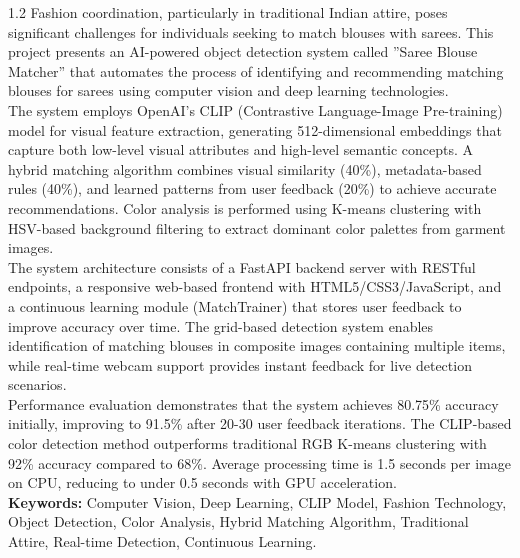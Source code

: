 \documentclass[12pt,a4paper]{report}
\begin{document}
\begin{spacing}{1.2}
Fashion coordination, particularly in traditional Indian attire, poses significant challenges for individuals seeking to match blouses with sarees. This project presents an AI-powered object detection system called ”Saree Blouse Matcher” that automates the process of identifying and recommending matching blouses for sarees using computer vision and deep learning technologies. \\

The system employs OpenAI’s CLIP (Contrastive Language-Image Pre-training) model for visual feature extraction, generating 512-dimensional embeddings that capture both low-level visual attributes and high-level semantic concepts. A hybrid matching algorithm combines visual similarity (40\%), metadata-based rules (40\%), and learned patterns from user feedback (20\%) to achieve accurate recommendations. Color analysis is performed using K-means clustering with HSV-based background filtering to extract dominant color palettes from garment images. \\

The system architecture consists of a FastAPI backend server with RESTful endpoints, a responsive web-based frontend with HTML5/CSS3/JavaScript, and a continuous learning module (MatchTrainer) that stores user feedback to improve accuracy over time. The grid-based detection system enables identification of matching blouses in composite images containing multiple items, while real-time webcam support provides instant feedback for live detection scenarios. \\

Performance evaluation demonstrates that the system achieves 80.75\% accuracy initially, improving to 91.5\% after 20-30 user feedback iterations. The CLIP-based color detection method outperforms traditional RGB K-means clustering with 92\% accuracy compared to 68\%. Average processing time is 1.5 seconds per image on CPU, reducing to under 0.5 seconds with GPU acceleration. \\

\noindent \textbf{Keywords:} Computer Vision, Deep Learning, CLIP Model, Fashion Technology, Object Detection, Color Analysis, Hybrid Matching Algorithm, Traditional Attire, Real-time Detection, Continuous Learning.
\end{spacing}
\end{document}
